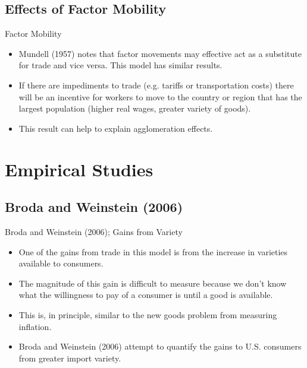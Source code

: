 \documentclass[aspectratio=169]{beamer}
\begin{document}

\subsection{Effects of Factor Mobility}


\begin{frame}{Factor Mobility}

\begin{itemize}
    \item<1-> Mundell (1957) notes that factor movements may effective act as a substitute for trade and vice versa.  This model has similar results.
    \item<2-> If there are impediments to trade (e.g. tariffs or transportation costs) there will be an incentive for workers to move to the country or region that has the largest population (higher real wages, greater variety of goods).
    \item<3-> This result can help to explain agglomeration effects.
\end{itemize}
    
\end{frame}


\section{Empirical Studies}

\subsection{Broda and Weinstein (2006)}


\begin{frame}{Broda and Weinstein (2006); Gains from Variety}

\begin{itemize}
    \item<1-> One of the gains from trade in this model is from the increase in varieties available to consumers.
    \item<2-> The magnitude of this gain is difficult to measure because we don’t know what the willingness to pay of a consumer is until a good is available.
    \item<3-> This is, in principle, similar to the new goods problem from measuring inflation.
    \item<4-> Broda and Weinstein (2006) attempt to quantify the gains to U.S. consumers from greater import variety.
\end{itemize}
    
\end{frame}
\end{document}
